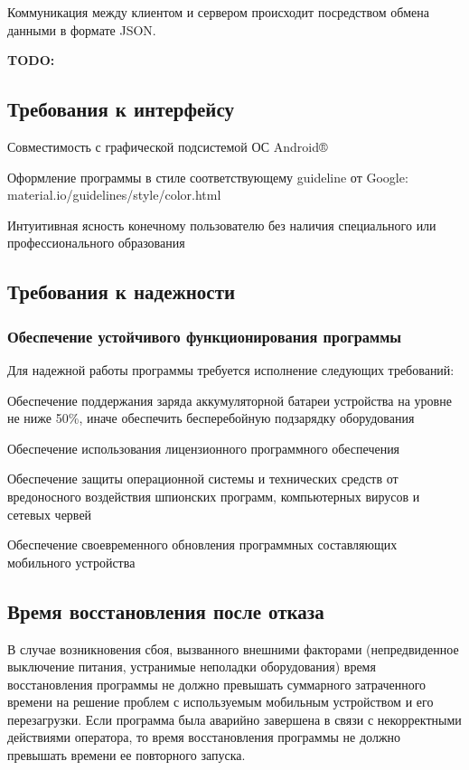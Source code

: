 Коммуникация между клиентом и сервером происходит посредством обмена данными в формате JSON.

\textbf{TODO:}
\subsection{Требования к интерфейсу}

\begin{my_enumerate}
\item Совместимость с графической подсистемой ОС Android®
\item Оформление программы в стиле соответствующему guideline от Google:\\ material.io/guidelines/style/color.html
\item Интуитивная ясность конечному пользователю без наличия специального или профессионального образования
\end{my_enumerate}

\subsection{Требования к надежности}
\subsubsection{Обеспечение устойчивого функционирования программы}
Для надежной работы программы требуется исполнение следующих требований:
\begin{my_enumerate}
\item Обеспечение поддержания заряда аккумуляторной батареи устройства на уровне не ниже 50\%, иначе обеспечить бесперебойную подзарядку оборудования
\item Обеспечение использования лицензионного программного обеспечения
\item Обеспечение защиты операционной системы и технических средств от вредоносного воздействия шпионских программ, компьютерных вирусов и сетевых червей
\item Обеспечение своевременного обновления программных составляющих мобильного устройства
\end{my_enumerate}


\subsection{Время восстановления после отказа}
В случае возникновения сбоя, вызванного внешними факторами (непредвиденное выключение питания, 
устранимые неполадки оборудования) время восстановления программы не должно превышать суммарного 
затраченного времени на решение проблем с используемым мобильным устройством и его перезагрузки. Если 
программа была аварийно завершена в связи с некорректными действиями оператора, то время восстановления 
программы не должно превышать времени ее повторного запуска.

